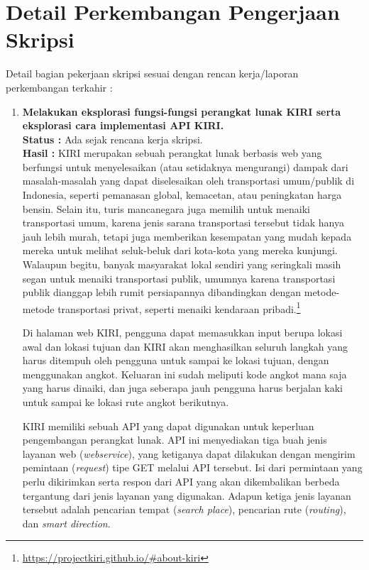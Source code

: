 \documentclass[a4paper,twoside]{article}
\begin{document}
\section{Detail Perkembangan Pengerjaan Skripsi}
\label{sec:devdetail}
Detail bagian pekerjaan skripsi sesuai dengan rencan kerja/laporan perkembangan terkahir :
	\begin{enumerate}
		\item \textbf{Melakukan eksplorasi fungsi-fungsi perangkat lunak KIRI serta eksplorasi cara \mbox{implementasi} API KIRI.}\\
		{\bf Status :} Ada sejak rencana kerja skripsi.\\
		{\bf Hasil :} KIRI merupakan sebuah perangkat lunak berbasis web yang berfungsi untuk menyelesaikan (atau setidaknya mengurangi) dampak dari masalah-masalah yang dapat diselesaikan oleh transportasi umum/publik di Indonesia, seperti pemanasan global, kemacetan, atau peningkatan harga bensin. Selain itu, turis mancanegara juga memilih untuk menaiki transportasi umum, karena jenis sarana transportasi tersebut tidak hanya jauh lebih murah, tetapi juga memberikan kesempatan yang mudah kepada mereka untuk melihat seluk-beluk dari kota-kota yang mereka kunjungi. Walaupun begitu, banyak masyarakat lokal sendiri yang seringkali masih segan untuk menaiki transportasi publik, umumnya karena transportasi publik dianggap lebih rumit persiapannya dibandingkan dengan metode-metode transportasi privat, seperti menaiki kendaraan pribadi.\footnote{\href{https://projectkiri.github.io/\#about-kiri}{https://projectkiri.github.io/\#about-kiri}}

Di halaman web KIRI, pengguna dapat memasukkan input berupa lokasi awal dan lokasi tujuan dan KIRI akan menghasilkan seluruh langkah yang harus ditempuh oleh pengguna untuk sampai ke lokasi tujuan, dengan menggunakan angkot. Keluaran ini sudah meliputi kode angkot mana saja yang harus dinaiki, dan juga seberapa jauh pengguna harus berjalan kaki untuk sampai ke lokasi rute angkot berikutnya.

KIRI memiliki sebuah API yang dapat digunakan untuk keperluan pengembangan perangkat lunak. API ini menyediakan tiga buah jenis layanan web (\textit{webservice}), yang ketiganya dapat dilakukan dengan mengirim pemintaan (\textit{request}) tipe GET melalui API tersebut. Isi dari permintaan yang perlu dikirimkan serta respon dari API yang akan dikembalikan berbeda tergantung dari jenis layanan yang digunakan. Adapun ketiga jenis layanan tersebut adalah pencarian tempat (\textit{search place}), pencarian rute (\textit{routing}), dan \textit{smart direction}.
 

\end{enumerate}
\end{document}
